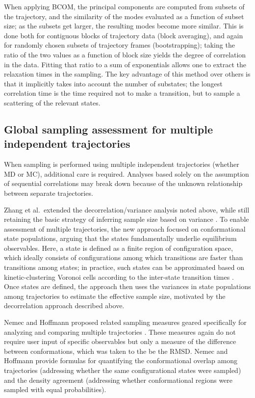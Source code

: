 When applying BCOM, the principal components are computed from subsets of the trajectory, and the similarity of the modes evaluated as a function of subset size; as the subsets get larger, the resulting modes become more similar.  This is done both for contiguous blocks of trajectory data (block averaging), and again for randomly chosen subsets of trajectory frames (bootstrapping); taking the ratio of the two values as a function of block size yields the degree of correlation in the data.  Fitting that ratio to a sum of exponentials allows one to extract the relaxation times in the sampling.  The key advantage of this method over others is that it implicitly takes into account the number of substates; the longest correlation time is the time required not to make a transition, but to sample a scattering of the relevant states. 

\subsection{Global sampling assessment for multiple independent trajectories}
\label{sec:globalMultiTraj}
When sampling is performed using multiple independent trajectories (whether MD or MC), additional care is required.
Analyses based solely on the assumption of sequential correlations may break down because of the unknown relationship between separate trajectories.

Zhang et al.\ extended the decorrelation/variance analysis noted above, while still retaining the basic strategy of inferring sample size based on variance \cite{Zhang2010}.
To enable assessment of multiple trajectories, the new approach focused on conformational state populations, arguing that the states fundamentally underlie equilibrium observables.
Here, a state is defined as a finite region of configuration space, which ideally consists of configurations among which transitions are faster than transitions among states; 
in practice, such states can be approximated based on kinetic-clustering Voronoi cells according to the inter-state transition times \cite{Zhang2010}.
Once states are defined, the approach then uses the variances in state populations among trajectories to estimate the effective sample size, motivated by the decorrelation approach \cite{Lyman2007a} described above.

Nemec and Hoffmann proposed related sampling measures geared specifically for analyzing and comparing multiple trajectories \cite{Nemec2017}.
These measures again do not require user input of specific observables but only a measure of the difference between conformations, which was taken to the be the RMSD.
Nemec and Hoffmann provide formulas for quantifying the conformational overlap among trajectories (addressing whether the same configurational states were sampled) and the density agreement (addressing whether conformational regions were  sampled with equal probabilities).


